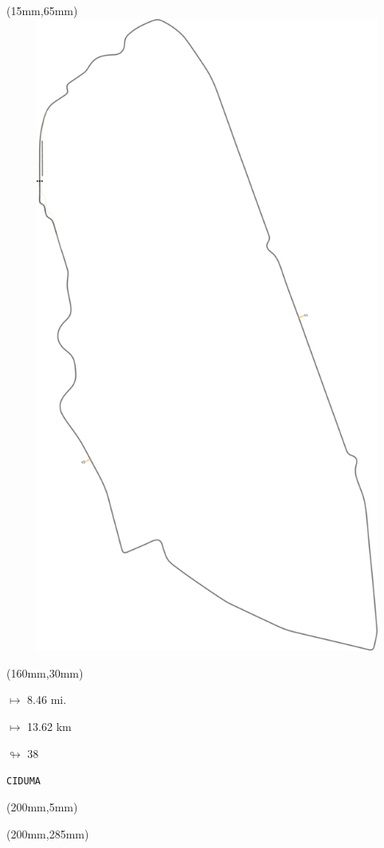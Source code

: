 \begin{textblock*}{185mm}(15mm,65mm)%
\centering
\mbox{\includegraphics[width=185mm,height=210mm,keepaspectratio]{PT/CIDUMA.pdf}}
\end{textblock*}
\begin{textblock*}{40mm}(160mm,30mm)%
\Large
\par$\mapsto$ 8.46 mi.
\par$\mapsto$ 13.62 km
\par$\looparrowright$ 38
\par\hfill\tiny\tt CIDUMA\\
\end{textblock*}
\begin{textblock*}{20mm}(200mm,5mm)%
\fbox{\thepage}
\label{CIDUMA}
\end{textblock*}
\begin{textblock*}{20mm}(200mm,285mm)%
\fbox{\thepage}
\end{textblock*}

